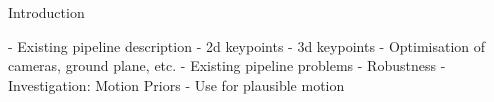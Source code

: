 Introduction

- Existing pipeline description
    - 2d keypoints
    - 3d keypoints
    - Optimisation of cameras, ground plane, etc.
- Existing pipeline problems
    - Robustness
- Investigation: Motion Priors
    - Use for plausible motion
